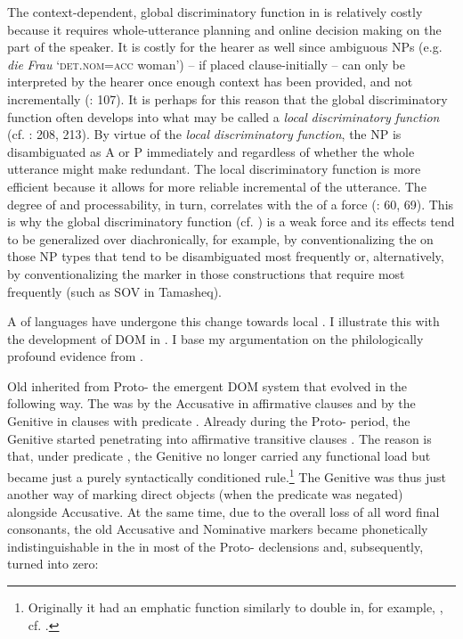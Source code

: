 \documentclass[output=paper]{langsci/langscibook}
\begin{document}
The context-dependent, global discriminatory function in  is relatively costly because it requires whole-utterance planning and online decision making on the part of the speaker. It is costly for the hearer as well since ambiguous NPs (e.g.  \textit{die} \textit{Frau} ‘\textsc{det.nom=acc} woman’) – if placed clause-initially – can only be interpreted by the hearer once enough context has been provided, and not incrementally (\citealt{Bornkessel-SchlesewskySchlesewsky2014}: 107). It is perhaps for this reason that the global discriminatory function often develops into what may be called a \textit{local} \textit{discriminatory} \textit{function} (cf. \citealt{Aissen2003,ZeevatJäger2002,Jäger2004,Malchukov2008}: 208, 213). By virtue of the \textit{local} \textit{discriminatory} \textit{function}, the NP is disambiguated as A or P immediately and regardless of whether the whole utterance might make  redundant. The local discriminatory function is more efficient because it allows for more reliable incremental  of the utterance. The degree of  and processability, in turn, correlates with the  of a force (\citealt{Hawkins2014_CompMot}: 60, 69). This is why the global discriminatory function (cf. ) is a weak force and its effects tend to be generalized over diachronically, for example, by conventionalizing the  on those NP types that tend to be disambiguated most frequently or, alternatively, by conventionalizing the marker in those constructions that require  most frequently (such as SOV in Tamasheq). 

A  of languages have undergone this change towards local . I illustrate this with the development of DOM in . I base my argumentation on the philologically profound evidence from \citet{Krysko1994_Russ,Krysko1997_Russ}. 

Old  inherited from Proto- the emergent DOM system that evolved in the following way. The  was  by the Accusative  in affirmative clauses and by the Genitive  in clauses with predicate . Already during the Proto- period, the Genitive started penetrating into affirmative transitive clauses \citep{Klenin1983}. The reason is that, under predicate , the Genitive no longer carried any functional load but became just a purely syntactically conditioned rule.\footnote{Originally it had an emphatic function similarly to double  in, for example, , cf. \citet{Kuryłowicz1971}.} The Genitive was thus just another way of marking direct objects (when the predicate was negated) alongside Accusative. At the same time, due to the overall loss of all word final consonants, the old Accusative and Nominative markers became phonetically indistinguishable in the  in most of the Proto- declensions and, subsequently, turned into zero:
\end{document}
